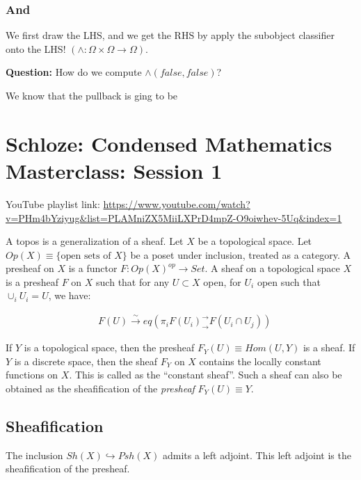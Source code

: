 \documentclass[11pt]{book}
\DeclarePairedDelimiter{\ceil}{\lceil}{\rceil}
\begin{document}
\subsection{And}

We first draw the LHS, and we get the RHS by apply the subobject classifier
onto the LHS!  $(\land: \Omega \times \Omega \rightarrow \Omega)$. 


\textbf{Question:} How do we compute $\land(false, false)$?

We know that the pullback is ging to be

\chapter{Schloze: Condensed Mathematics Masterclass: Session 1}

YouTube playlist link: \url{https://www.youtube.com/watch?v=PHm4bYziyug&list=PLAMniZX5MiiLXPrD4mpZ-O9oiwhev-5Uq&index=1}


A topos is a generalization of a sheaf. Let $X$ be a topological space. Let $Op(X) \equiv \{ \text{open sets of } X \}$ be a poset 
under inclusion, treated as a category.  A presheaf on $X$ is a functor $F: Op(X)^{op} \rightarrow Set$.
A sheaf on a topological space $X$ is a presheaf $F$ on $X$ such that for any $U \subset X$ open, for $U_i$ open such that
$\cup_i U_i = U$, we have:

\begin{align*}
    &F(U) \xrightarrow{\sim} eq \left(\pi_i F(U_i)^\rightarrow_\rightarrow F(U_i \cap U_j) \right)
\end{align*}

If $Y$ is a topological space, then the presheaf $F_Y(U) \equiv Hom(U, Y)$ is a sheaf.  If $Y$ is a discrete space,
then the sheaf $F_Y$ on $X$ contains the locally constant functions on $X$. This is called as the ``constant sheaf''.
Such a sheaf can also be obtained as the sheafification of the \emph{presheaf} $F_Y(U) \equiv Y$.

\section{Sheafification}
The inclusion $Sh(X) \hookrightarrow Psh(X)$ admits a left adjoint.  This left
adjoint is the sheafification of the presheaf. 
\end{document}
